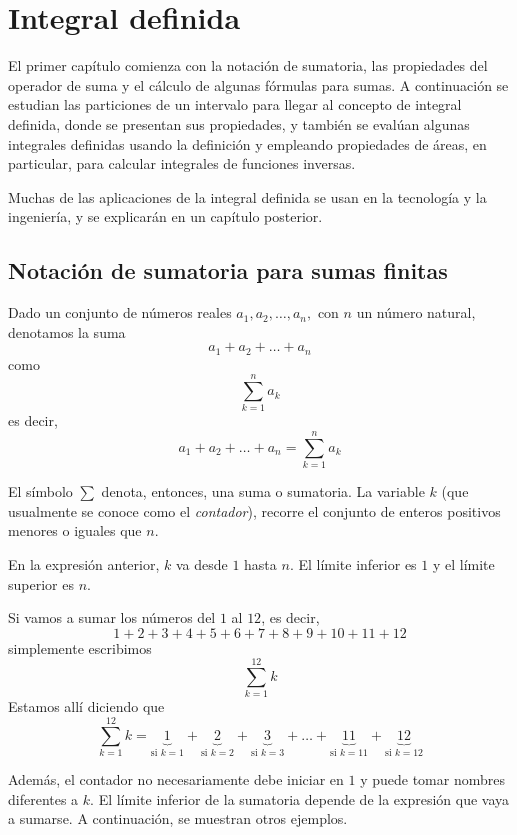 \chapter{Integral definida}\label{definida}

El primer capítulo comienza con la notación de sumatoria, las propiedades del operador de suma y el cálculo de algunas fórmulas para sumas. A continuación se estudian las particiones de un intervalo para llegar al concepto de integral definida, donde se presentan sus propiedades, y también se evalúan algunas integrales definidas usando la definición y empleando propiedades de áreas, en particular, para calcular integrales de funciones inversas.

Muchas de las aplicaciones de la integral definida se usan en la tecnología y la ingeniería, y se explicarán en un capítulo posterior.

\section{Notación de sumatoria para sumas finitas}

Dado un conjunto de números reales $a_{1},a_{2},\ldots ,a_{n},$ con $n$ un número natural, denotamos la suma
\[
  a_{1}+a_{2}+\ldots +a_{n}
\]
como
\[
  \sum_{k=1}^n a_k
\]
es decir,
\[
  a_{1}+a_{2}+\ldots +a_{n}=\sum_{k=1}^n a_k
\]

El símbolo $\sum $ denota, entonces, una suma o sumatoria. La variable $k$ (que usualmente se conoce como el \textit{contador}), recorre el conjunto de enteros positivos menores o iguales que $n$.

En la expresión anterior, $k$ va desde $1$ hasta $n$. El límite inferior es $1$ y el límite superior es $n$.

\begin{ejemplo}
  Si vamos a sumar los números del $1$ al $12$, es decir,
  \[
    1+2+3+4+5+6+7+8+9+10+11+12
  \]
  simplemente escribimos
  \[
    \sum_{k=1}^{12} k
  \]
  Estamos allí diciendo que
  \[
    \sum_{k=1}^{12} k=\underbrace{1}_{\text{si }k=1}+\underbrace{2}_{\text{si }k=2}+\underbrace{3}_{\text{si }k=3}+\ldots+\underbrace{11}_{\text{si }k=11}+\underbrace{12}_{\text{si }k=12}
  \]
\end{ejemplo}

Además, el contador no necesariamente debe iniciar en $1$ y puede tomar nombres diferentes a $k$. El límite inferior de la sumatoria depende de la expresión que vaya a sumarse. A continuación, se muestran otros ejemplos.

